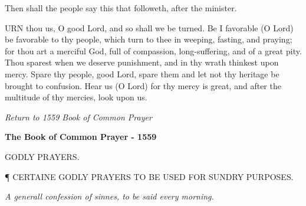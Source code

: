 Then shall the people say this that followeth,
after the minister.

URN thou us, O good Lord, and so shall we be turned. Be I favorable (O Lord)
be favorable to thy people, which turn to thee in weeping, fasting, and praying; for thou
art a merciful God, full of compassion, long-suffering, and of a great pity. Thou
sparest when we deserve punishment, and in thy wrath thinkest upon mercy. Spare thy
people, good Lord, spare them and let not thy heritage be brought to confusion. Hear us (O
Lord) for thy mercy is great, and after the multitude of thy mercies, look upon us.

\emph{Return to 1559 Book of Common Prayer}


\textbf{The Book of Common Prayer - 1559}

GODLY
PRAYERS.

¶
CERTAINE GODLY PRAYERS TO BE USED FOR SUNDRY PURPOSES.

\emph{A generall confession of sinnes, to be said every morning.}

